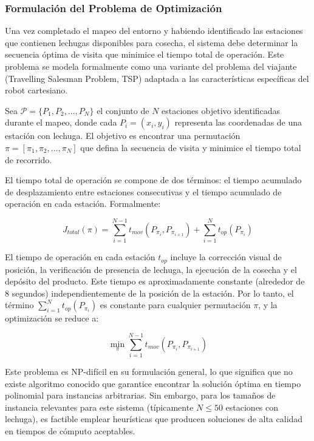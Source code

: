 \subsubsection{Formulación del Problema de Optimización}

Una vez completado el mapeo del entorno y habiendo identificado las estaciones que contienen lechugas disponibles para cosecha, el sistema debe determinar la secuencia óptima de visita que minimice el tiempo total de operación. Este problema se modela formalmente como una variante del problema del viajante (Travelling Salesman Problem, TSP) adaptada a las características específicas del robot cartesiano.

Sea $\mathcal{P} = \{P_1, P_2, ..., P_N\}$ el conjunto de $N$ estaciones objetivo identificadas durante el mapeo, donde cada $P_i = (x_i, y_i)$ representa las coordenadas de una estación con lechuga. El objetivo es encontrar una permutación $\pi = [\pi_1, \pi_2, ..., \pi_N]$ que defina la secuencia de visita y minimice el tiempo total de recorrido.

El tiempo total de operación se compone de dos términos: el tiempo acumulado de desplazamiento entre estaciones consecutivas y el tiempo acumulado de operación en cada estación. Formalmente:

\begin{equation}
J_{total}(\pi) = \sum_{i=1}^{N-1} t_{mov}(P_{\pi_i}, P_{\pi_{i+1}}) + \sum_{i=1}^{N} t_{op}(P_{\pi_i})
\end{equation}

El tiempo de operación en cada estación $t_{op}$ incluye la corrección visual de posición, la verificación de presencia de lechuga, la ejecución de la cosecha y el depósito del producto. Este tiempo es aproximadamente constante (alrededor de 8 segundos) independientemente de la posición de la estación. Por lo tanto, el término $\sum_{i=1}^{N} t_{op}(P_{\pi_i})$ es constante para cualquier permutación $\pi$, y la optimización se reduce a:

\begin{equation}
\min_{\pi} \sum_{i=1}^{N-1} t_{mov}(P_{\pi_i}, P_{\pi_{i+1}})
\end{equation}

Este problema es NP-difícil en su formulación general, lo que significa que no existe algoritmo conocido que garantice encontrar la solución óptima en tiempo polinomial para instancias arbitrarias. Sin embargo, para los tamaños de instancia relevantes para este sistema (típicamente $N \leq 50$ estaciones con lechuga), es factible emplear heurísticas que producen soluciones de alta calidad en tiempos de cómputo aceptables.

